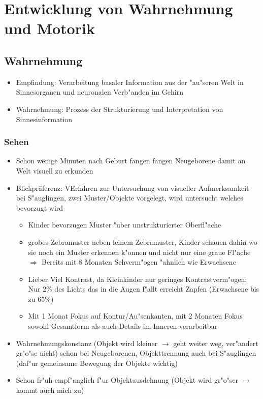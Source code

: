 
\section{Entwicklung von Wahrnehmung und Motorik}
\subsection{Wahrnehmung}
\begin{itemize}
	\item
		Empfindung: Verarbeitung basaler Information aus der "au"seren Welt in Sinnesorganen und neuronalen Verb"anden im Gehirn
	\item
		Wahrnehmung: Prozess der Strukturierung und Interpretation von Sinnesinformation
\end{itemize}

\subsubsection{Sehen}
\begin{itemize}
	\item
		Schon wenige Minuten nach Geburt fangen fangen Neugeborene damit an Welt visuell zu erkunden
	\item
		Blickpräferenz: VErfahren zur Untersuchung von visueller Aufmerksamkeit bei S"auglingen, zwei Muster/Objekte vorgelegt, wird untersucht welches bevorzugt wird
		\begin{itemize}
			\item
				Kinder bevorzugen Muster "uber unstrukturierter Oberfl"ache
			\item
				grobes Zebramuster neben feinem Zebramuster, Kinder schauen dahin wo sie noch ein Muster erkennen k"onnen und nicht nur eine graue Fl"ache\\
				$\Rightarrow$ 
				Bereits mit 8 Monaten Sehverm"ogen "ahnlich wie Erwachsene

			\item
				Lieber Viel Kontrast, da Kleinkinder nur geringes Kontrastverm"ogen: Nur 2\% des Lichts das in die Augen f"allt erreicht Zapfen (Erwachsene bis zu 65\%)
			\item
				Mit 1 Monat Fokus auf Kontur/Au"senkanten, mit 2 Monaten Fokus sowohl Gesamtform als auch Details im Inneren verarbeitbar
		\end{itemize}
	\item
		Wahrnehmungskonstanz (Objekt wird kleiner $\rightarrow$ geht weiter weg, ver"andert gr"o"se nicht) schon bei Neugeborenen, Objekttrennung auch bei S"auglingen (daf"ur gemeinsame Bewegung der Objekte wichtig)
	\item
		Schon fr"uh empf"anglich f"ur Objektausdehnung (Objekt wird gr"o"ser $\rightarrow$ kommt auch mich zu)
\end{itemize}


